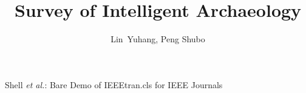 \documentclass[journal]{IEEEtran}
\begin{document}
		\title{Survey of Intelligent Archaeology}
		
		\author{Lin~Yuhang, Peng Shubo}%
		
		
	
	
	
	{Shell \MakeLowercase{\textit{et al.}}: Bare Demo of IEEEtran.cls for IEEE Journals}
	
\end{document}
